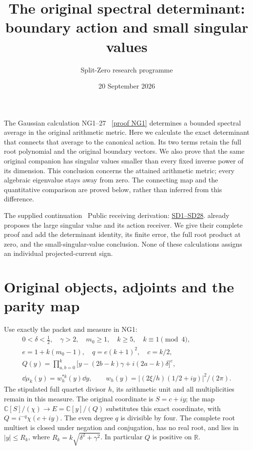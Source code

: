 \documentclass[11pt]{article}
\title{The original spectral determinant:\\boundary action and small singular values}
\author{Split-Zero research programme}\date{20 September 2026}
\newcommand{\R}{\mathbb R}\newcommand{\C}{\mathbb C}
\begin{document}
\maketitle

The Gaussian calculation NG1--27 \cite{NG}%
~\href{https://github.com/KokunoYumeto/zeta-function-research-reader/blob/5992ad50c0f2a06921f1fcaded7b4e38097c0739/workbenches/splitzero-tandem/continuations/20260920-original-kernel-mixed-determinants/providers/GAUSSIAN_ARITHMETIC_RETURN.tex\#L31}{[proof NG1]}%
{} determines a bounded spectral
average in the original arithmetic metric. Here we calculate the exact
determinant that connects that average to the canonical action. Its two
terms retain the full root polynomial and the original boundary vectors.
We also prove that the same original companion has singular values smaller
than every fixed inverse power of its dimension. This conclusion concerns
the attained arithmetic metric; every algebraic eigenvalue stays away
from zero. The connecting map and the quantitative comparison are proved
below, rather than inferred from this difference.

The supplied continuation \cite[Section 5]{incoming}%
~Public receiving derivation: \href{https://github.com/KokunoYumeto/zeta-function-research-reader/blob/689a8f87e9c12b7a99b01b3123438c6751ee608f/workbenches/splitzero-tandem/continuations/20260920-original-spectral-determinant/ORIGINAL_SPECTRAL_DETERMINANT.tex\#L34}{SD1--SD28}.%
{} already proposes the
large singular value and its action receiver. We give their complete
proof and add the determinant identity, its finite error, the full root
product at zero, and the small-singular-value conclusion. None of these
calculations assigns an individual projected-current sign.

\section{Original objects, adjoints and the parity map}
Use exactly the packet and measure in NG1:
\begin{equation}\tag{SD1}
\begin{gathered}
0<\delta<\tfrac12,\quad\gamma>2,\quad m_0\ge1,\quad
k\ge5,\quad k\equiv1\pmod4,\\
e=1+k(m_0-1),\quad q=e(k+1)^2,\quad c=k/2,\\
Q(y)=\prod_{a,b=0}^k
\bigl[y-(2b-k)\gamma+i(2a-k)\delta\bigr]^e,\\
\dd\mu_k(y)=w_h^{*k}(y)\dd y,\qquad
w_h(y)=|(2\xi/h)(1/2+iy)|^2/(2\pi).
\end{gathered}
\end{equation}
The stipulated full quartet divisor $h$, its arithmetic unit and all
multiplicities remain in this measure. The original coordinate is
$S=c+iy$; the map $\C[S]/(\chi)\to E=\C[y]/(Q)$ substitutes this exact
coordinate, with $Q=i^{-q}\chi(c+iy)$. The even degree $q$ is divisible
by four. The complete root multiset is closed under negation and
conjugation, has no real root, and lies in $|y|\le R_k$, where
$R_k=k\sqrt{\delta^2+\gamma^2}$. In particular $Q$ is positive on $\R$.
\end{document}
